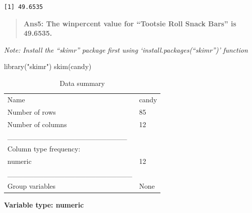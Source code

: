 \documentclass[
  letterpaper,
  DIV=11,
  numbers=noendperiod]{scrartcl}
\newenvironment{Shaded}{\begin{snugshade}}{\end{snugshade}}
\newcommand{\FunctionTok}[1]{\textcolor[rgb]{0.28,0.35,0.67}{#1}}
\newcommand{\NormalTok}[1]{\textcolor[rgb]{0.00,0.23,0.31}{#1}}
\newcommand{\StringTok}[1]{\textcolor[rgb]{0.13,0.47,0.30}{#1}}
\begin{document}
\begin{verbatim}
[1] 49.6535
\end{verbatim}

\begin{quote}
\textbf{Ans5: The winpercent value for ``Tootsie Roll Snack Bars'' is
49.6535.}
\end{quote}

\emph{Note: Install the ``skimr'' package first using
`install.packages(``skimr'')' function}

\begin{Shaded}
\begin{Highlighting}[]
\FunctionTok{library}\NormalTok{(}\StringTok{"skimr"}\NormalTok{)}
\FunctionTok{skim}\NormalTok{(candy)}
\end{Highlighting}
\end{Shaded}

\begin{longtable}[]{@{}ll@{}}
\caption{Data summary}\tabularnewline
\toprule()
\endhead
Name & candy \\
Number of rows & 85 \\
Number of columns & 12 \\
\_\_\_\_\_\_\_\_\_\_\_\_\_\_\_\_\_\_\_\_\_\_\_ & \\
Column type frequency: & \\
numeric & 12 \\
\_\_\_\_\_\_\_\_\_\_\_\_\_\_\_\_\_\_\_\_\_\_\_\_ & \\
Group variables & None \\
\bottomrule()
\end{longtable}

\textbf{Variable type: numeric}
\end{document}
